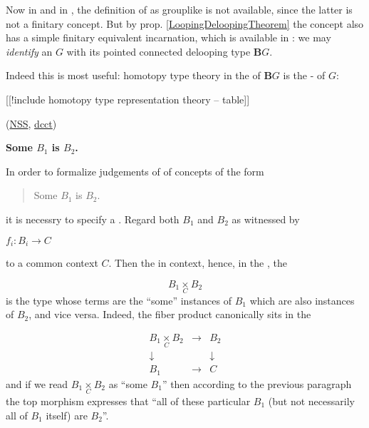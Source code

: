 \documentclass[12pt,titlepage]{article}
\newcommand{\itexarray}[1]{\begin{matrix}#1\end{matrix}}
\theoremstyle{plain}
\theoremstyle{definition}
\theoremstyle{remark}
\begin{document}
Now in  and in , the definition of  as grouplike  is not available, since the latter is not a finitary concept. But by prop. \ref{LoopingDeloopingTheorem} the concept also has a simple finitary equivalent incarnation, which is available in : we may \emph{identify} an  $G$ with its pointed connected delooping type $\mathbf{B}G$.

Indeed this is most useful: homotopy type theory in the  of $\mathbf{B}G$ is the - of $G$:

[[!include homotopy type representation theory -- table]]

(\hyperlink{NSS}{NSS}, \hyperlink{dcct}{dcct})

\textbf{Some $B_1$ is $B_2$.}

In order to formalize judgements of  of concepts of the form

\begin{quote}%
Some $B_1$ is $B_2$.


\end{quote}
it is necessry to specify a . Regard both $B_1$ and $B_2$ as  witnessed by 

$f_i \colon B_i \longrightarrow C$

to a common context $C$. Then the  in context, hence, in the , the 

\begin{displaymath}
B_1 \underset{C}{\times} B_2
\end{displaymath}
is the type whose terms are the ``some'' instances of $B_1$ which are also instances of $B_2$, and vice versa. Indeed, the fiber product canonically sits in the  

\begin{displaymath}
\itexarray{
    B_1 \underset{C}{\times} B_2
    &\longrightarrow&
    B_2
    \\
    \downarrow && \downarrow
    \\
    B_1 &\longrightarrow& C
  }
\end{displaymath}
and if we read $B_1 \underset{C}{\times} B_2$ as ``some $B_1$'' then according to the previous paragraph the top morphism expresses that ``all of these particular $B_1$ (but not necessarily all of $B_1$ itself) are $B_2$''.
\end{document}
